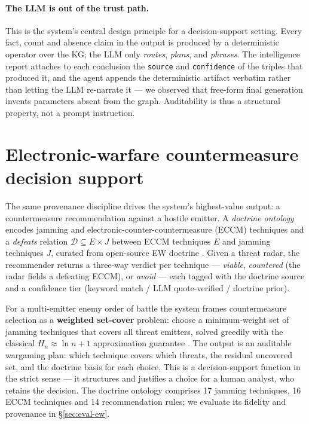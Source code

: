 \documentclass[review]{elsarticle}
\begin{document}
\paragraph{The LLM is out of the trust path.}
This is the system's central design principle for a decision-support setting.
Every fact, count and absence claim in the output is produced by a
deterministic operator over the KG; the LLM only \emph{routes}, \emph{plans},
and \emph{phrases}. The intelligence report attaches to each conclusion the
\texttt{source} and \texttt{confidence} of the triples that produced it, and
the agent appends the deterministic artifact verbatim rather than letting the
LLM re-narrate it --- we observed that free-form final generation invents
parameters absent from the graph. Auditability is thus a structural property,
not a prompt instruction.

\section{Electronic-warfare countermeasure decision support}
\label{sec:ew}

The same provenance discipline drives the system's highest-value output: a
countermeasure recommendation against a hostile emitter. A \emph{doctrine
ontology} encodes jamming and electronic-counter-countermeasure (ECCM)
techniques and a \emph{defeats} relation $\mathcal{D}\subseteq E\times J$
between ECCM techniques $E$ and jamming techniques $J$, curated from
open-source EW doctrine
\citep{adamy2001ew101,schleher1999ew,zhang2023cognitiveew}. Given a threat
radar, the recommender returns a three-way verdict per technique ---
\emph{viable}, \emph{countered} (the radar fields a defeating ECCM), or
\emph{avoid} --- each tagged with the doctrine source and a confidence tier
(keyword match / LLM quote-verified / doctrine prior).

For a multi-emitter enemy order of battle the system frames countermeasure
selection as a \textbf{weighted set-cover} problem: choose a minimum-weight set
of jamming techniques that covers all threat emitters, solved greedily with the
classical $H_n\!\approx\!\ln n + 1$ approximation guarantee
\citep{chvatal1979setcover}. The output is an auditable wargaming plan: which
technique covers which threats, the residual uncovered set, and the doctrine
basis for each choice. This is a decision-support function in the strict sense
\citep{power2002dss} --- it structures and justifies a choice for a human
analyst, who retains the decision. The doctrine ontology comprises 17 jamming
techniques, 16 ECCM techniques and 14 recommendation rules; we evaluate its
fidelity and provenance in \S\ref{sec:eval-ew}.
\end{document}
